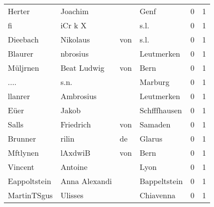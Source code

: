 \begin{tabular}{llllrr}
                   Herter &                            Joachim &             &                                        Genf &          0 &         1 \\
                       fi &                            iCr k X &             &                                        s.l. &          0 &         1 \\
                 Dieebach &                           Nikolaus &         von &                                        s.l. &          0 &         1 \\
                  Blaurer &                           nbrosius &             &                                  Leutmerken &          0 &         1 \\
                 Müljrnen &                        Beat Ludwig &         von &                                        Bern &          0 &         1 \\
                     .... &                               s.n. &             &                                     Marburg &          0 &         1 \\
                  llanrer &                          Ambrosius &             &                                  Leutmerken &          0 &         1 \\
                     Eüer &                              Jakob &             &                                Schfffhausen &          0 &         1 \\
                    Salls &                          Friedrich &         von &                                     Samaden &          0 &         1 \\
                  Brunner &                              rilin &          de &                                      Glarus &          0 &         1 \\
                 Mftlynen &                            lAxdwiB &         von &                                        Bern &          0 &         1 \\
                  Vincent &                            Antoine &             &                                        Lyon &          0 &         1 \\
             Eappoltstein &                      Anna Alexandi &             &                                Bappeltstein &          0 &         1 \\
              MartinTSgus &                            Ulisses &             &                                   Chiavenna &          0 &         1 \\

\end{tabular}
